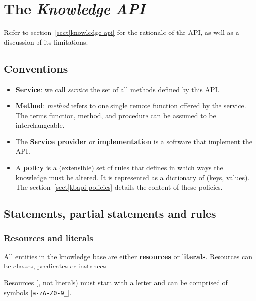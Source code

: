 \chapter{The \emph{Knowledge API}}
\label{chapter|kb-api}

Refer to section~\ref{sect|knowledge-api} for the rationale of the API, as well
as a discussion of its limitations.

\section{Conventions}

\begin{itemize}

    \item  \textbf{Service}: we call \emph{service} the set of all methods
    defined by this API.

    \item  \textbf{Method}: \emph{method} refers to one single remote function
    offered by the service. The terms function, method, and procedure can be
    assumed to be interchangeable.

    \item  The \textbf{Service provider} or \textbf{implementation} is a
    software that implement the API.

    \item  A \textbf{policy} is a (extensible) set of rules that defines in
    which ways the knowledge must be altered. It is represented as a dictionary
    of (keys, values). The section~\ref{sect|kbapi-policies} details the
    content of these policies.

\end{itemize}

\section{Statements, partial statements and rules}


\subsection{Resources and literals}


All entities in the knowledge base are either \textbf{resources} or
\textbf{literals}. Resources can be classes, predicates or instances.

Resources (\ie, not literals) must start with a letter and can be comprised of
symbols [{\tt a-zA-Z0-9\_}].

